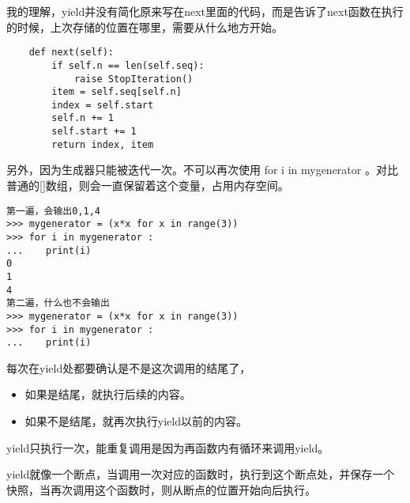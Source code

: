\documentclass{article}
\begin{document}
\mbox{}

我的理解，yield并没有简化原来写在next里面的代码，而是告诉了next函数在执行的时候，上次存储的位置在哪里，需要从什么地方开始。
\begin{lstlisting}
    def next(self):
        if self.n == len(self.seq):
            raise StopIteration()
        item = self.seq[self.n]
        index = self.start
        self.n += 1
        self.start += 1
        return index, item    
\end{lstlisting}

另外，因为生成器只能被迭代一次。不可以再次使用 for i in mygenerator 。对比普通的[]数组，则会一直保留着这个变量，占用内存空间。
\begin{lstlisting}
第一遍，会输出0,1,4
>>> mygenerator = (x*x for x in range(3))
>>> for i in mygenerator :
...    print(i)
0
1
4
第二遍，什么也不会输出
>>> mygenerator = (x*x for x in range(3))
>>> for i in mygenerator :
...    print(i)

\end{lstlisting}

每次在yield处都要确认是不是这次调用的结尾了，
\begin{itemize}
    \item 如果是结尾，就执行后续的内容。
    \item 如果不是结尾，就再次执行yield以前的内容。
\end{itemize}


yield只执行一次，能重复调用是因为再函数内有循环来调用yield。


yield就像一个断点，当调用一次对应的函数时，执行到这个断点处，并保存一个快照，当再次调用这个函数时，则从断点的位置开始向后执行。
\end{document}
